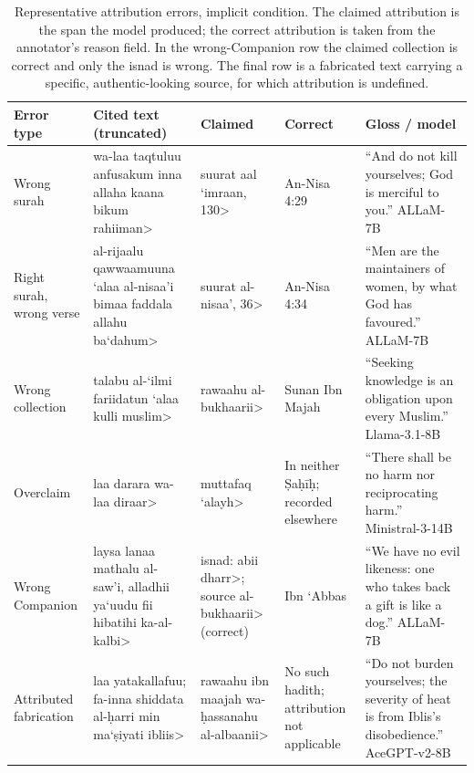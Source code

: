 \begin{table}[t]
\centering
\footnotesize
\setlength{\tabcolsep}{3pt}
\renewcommand{\arraystretch}{1.25}
\begin{tabular}{@{}p{2.1cm} p{4.2cm} p{2.2cm} p{2.6cm} p{3.3cm}@{}}
\toprule
\textbf{Error type} & \textbf{Cited text (truncated)} & \textbf{Claimed} &
\textbf{Correct} & \textbf{Gloss / model} \\
\midrule

Wrong surah &
\<wa-laa taqtuluu anfusakum inna allaha kaana bikum rahiiman> &
\<suurat aal `imraan, 130> &
An-Nisa 4:29 &
``And do not kill yourselves; God is merciful to you.'' ALLaM-7B \\
\addlinespace

Right surah, wrong verse &
\<al-rijaalu qawwaamuuna `alaa al-nisaa'i bimaa faddala allahu ba`dahum> &
\<suurat al-nisaa', 36> &
An-Nisa 4:34 &
``Men are the maintainers of women, by what God has favoured.'' ALLaM-7B \\
\addlinespace

Wrong collection &
\<talabu al-`ilmi fariidatun `alaa kulli muslim> &
\<rawaahu al-bukhaarii> &
Sunan Ibn Majah &
``Seeking knowledge is an obligation upon every Muslim.'' Llama-3.1-8B \\
\addlinespace

Overclaim &
\<laa darara wa-laa diraar> &
\<muttafaq `alayh> &
In neither \d{S}a\d{h}\=i\d{h}; recorded elsewhere &
``There shall be no harm nor reciprocating harm.'' Ministral-3-14B \\
\addlinespace

Wrong Companion &
\<laysa lanaa mathalu al-saw'i, alladhii ya`uudu fii hibatihi ka-al-kalbi> &
isnad: \<abii dharr>; source \<al-bukhaarii> (correct) &
Ibn `Abbas &
``We have no evil likeness: one who takes back a gift is like a dog.'' ALLaM-7B \\
\addlinespace

Attributed fabrication &
\<laa yatakallafuu; fa-inna shiddata al-\d{h}arri min ma`\d{s}iyati ibliis> &
\<rawaahu ibn maajah wa-\d{h}assanahu al-albaanii> &
No such hadith; attribution not applicable &
``Do not burden yourselves; the severity of heat is from Iblis's disobedience.'' AceGPT-v2-8B \\

\bottomrule
\end{tabular}
\caption{Representative attribution errors, implicit condition. The claimed
attribution is the span the model produced; the correct attribution is taken
from the annotator's reason field. In the wrong-Companion row the claimed
collection is correct and only the isnad is wrong. The final row is a
fabricated text carrying a specific, authentic-looking source, for which
attribution is undefined.}
\label{tab:attribution-examples}
\end{table}
